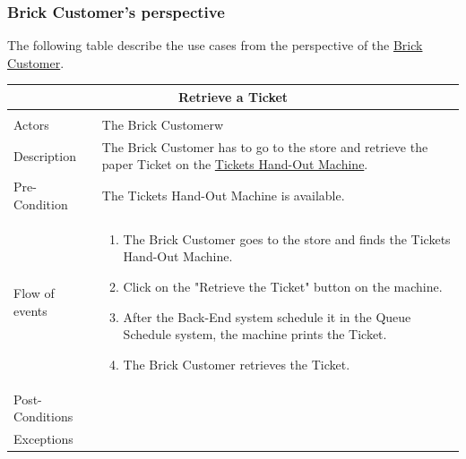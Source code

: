 \documentclass[a4paper,12pt]{report}
\begin{document}
\subsubsection{Brick Customer’s perspective}
The following table describe the use cases from the perspective of the  \hyperref[Definitions]{Brick Customer}.
\begin{center}
	\begin{tabular}{p{}|p{}}
		\multicolumn{2}{c}{\large \textbf{Retrieve a Ticket}} \\[3mm] 
		\hline \\
		Actors &  The Brick Customerw \\[3mm] 
		Description & The Brick Customer has to go to the store and retrieve the paper Ticket on the \hyperref[Definitions]{Tickets Hand-Out Machine}.   \\[3mm]  
		Pre-Condition &  The Tickets Hand-Out Machine is available.\\[3mm] 
		Flow of events & 
		\begin{enumerate}
			\item The Brick Customer goes to the store and finds the Tickets Hand-Out Machine.
			\item Click on the "Retrieve the Ticket" button on the machine.
			\item After the Back-End system schedule it in the Queue Schedule system, the machine prints the Ticket.
			\item The Brick Customer retrieves the Ticket.
		\end{enumerate}
		\\[3mm] 
		Post-Conditions & \\[3mm] 
		Exceptions & \\[3mm] 
	\end{tabular}
\end{center}
\end{document}
